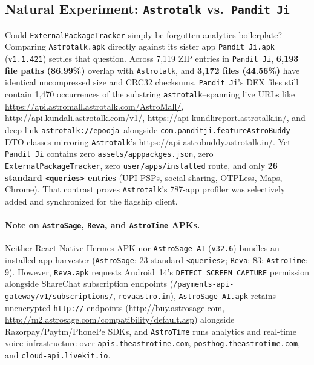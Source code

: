 \subsection{Natural Experiment: \texttt{Astrotalk} vs.\ \texttt{Pandit Ji}}
Could \texttt{ExternalPackageTracker} simply be forgotten analytics boilerplate? Comparing \texttt{Astrotalk.apk} directly against its sister app \texttt{Pandit Ji.apk} (\texttt{v1.1.421}) settles that question. Across 7,119 ZIP entries in \texttt{Pandit Ji}, \textbf{6,193 file paths (86.99\%)} overlap with \texttt{Astrotalk}, and \textbf{3,172 files (44.56\%)} have identical uncompressed size and CRC32 checksums. \texttt{Pandit Ji}'s DEX files still contain 1,470 occurrences of the substring \texttt{astrotalk}--spanning live URLs like \url{https://api.astromall.astrotalk.com/AstroMall/}, \url{http://api.kundali.astrotalk.com/v1/}, \url{https://api-kundlireport.astrotalk.in/}, and deep link \nolinkurl{astrotalk://epooja}--alongside \nolinkurl{com.panditji.featureAstroBuddy} DTO classes mirroring \texttt{Astrotalk}'s \url{https://api-astrobuddy.astrotalk.in/}. Yet \texttt{Pandit Ji} contains zero \nolinkurl{assets/apppackges.json}, zero \texttt{ExternalPackageTracker}, zero \nolinkurl{user/apps/installed} route, and only \textbf{26 standard \texttt{<queries>} entries} (UPI PSPs, social sharing, OTPLess, Maps, Chrome). That contrast proves \texttt{Astrotalk}'s 787-app profiler was selectively added and synchronized for the flagship client.

\paragraph{Note on \texttt{AstroSage}, \texttt{Reva}, and \texttt{AstroTime} APKs.}
Neither React Native Hermes APK nor \texttt{AstroSage AI} (\texttt{v32.6}) bundles an installed-app harvester (\texttt{AstroSage}: 23 standard \texttt{<queries>}; \texttt{Reva}: 83; \texttt{AstroTime}: 9). However, \texttt{Reva.apk} requests Android~14's \texttt{DETECT\_SCREEN\_CAPTURE} permission alongside ShareChat subscription endpoints (\nolinkurl{/payments-api-gateway/v1/subscriptions/}, \nolinkurl{revaastro.in}), \texttt{AstroSage AI.apk} retains unencrypted \texttt{http://} endpoints (\url{http://buy.astrosage.com}, \url{http://m2.astrosage.com/compatibility/default.asp}) alongside Razorpay/Paytm/PhonePe SDKs, and \texttt{AstroTime} runs analytics and real-time voice infrastructure over \nolinkurl{apis.theastrotime.com}, \nolinkurl{posthog.theastrotime.com}, and \nolinkurl{cloud-api.livekit.io}.

